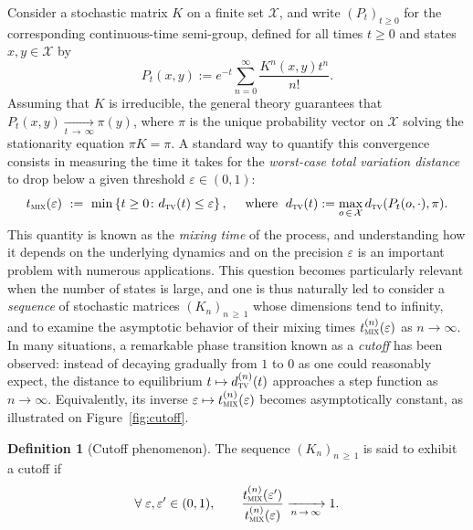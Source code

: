\documentclass[10pt]{amsart}
\theoremstyle{definition}\newtheorem{defi}[theo]{Definition}\newtheorem{rema}[theo]{Remark}\newtheorem{exam}[theo]{Example}\newtheorem{exem}[theo]{Example}\newtheorem{nota}[theo]{Notation}
\newcommand{\cX}{\mathcal{X}}
\newcommand{\dtv}{d_{\textsc{tv}}}
\newcommand{\tmix}{t_{\textsc{mix}}}
\let\oldforall\forall
\renewcommand*{\forall}{\mathrel{\oldforall}}
\begin{document}
Consider a stochastic matrix $K$ on a finite set $\cX$, and write $(P_t)_{t\ge 0}$ for the corresponding continuous-time semi-group, defined for all times $t\ge 0$ and states $x,y\in\cX$ by
\[
P_t(x,y) := e^{-t}\sum_{n=0}^\infty \frac{K^n(x,y)t^n}{n!}.
\]
Assuming that $K$ is irreducible, the general theory guarantees that $P_t(x,y)\xrightarrow[t\,\to\,\infty]{}\pi(y)$, where $\pi$ is the unique probability vector on $\cX$ solving the stationarity equation $\pi K=\pi$. A standard way to quantify this convergence consists in measuring the time it takes for the \emph{worst-case total variation distance} to drop below a given threshold $\varepsilon\in(0,1)$:
\[
\tmix(\varepsilon) \ := \ \min\left\{t\ge 0\colon \dtv(t)\le\varepsilon\right\},\quad \text{ where }\; \dtv(t) := \max_{o\,\in\,\cX}\dtv(P_t(o,\cdot),\pi).
\]
This quantity is known as the \emph{mixing time} of the process, and understanding how it depends on the underlying dynamics and on the precision $\varepsilon$ is an important problem with numerous applications. This question becomes particularly relevant when the number of states is large, and one is thus naturally led to consider a \emph{sequence} of stochastic matrices $(K_n)_{n\,\ge\,1}$ whose dimensions tend to infinity, and to examine the asymptotic behavior of their mixing times $\tmix^{(n)}(\varepsilon)$ as $n\to\infty$. In many situations, a remarkable phase transition known as a \emph{cutoff} has been observed: instead of decaying gradually from $1$ to $0$ as one could reasonably expect, the distance to equilibrium $t\mapsto\dtv^{(n)}(t)$ approaches a step function as $n\to\infty$. Equivalently, its inverse $\varepsilon\mapsto \tmix^{(n)}(\varepsilon)$ becomes asymptotically constant, as illustrated on Figure~\ref{fig:cutoff}.


\begin{defi}[{Cutoff phenomenon}]
The sequence $(K_n)_{n\,\ge\,1}$ is said to exhibit a cutoff if
\[
\forall \varepsilon,\varepsilon'\in(0,1),\qquad \frac{\tmix^{(n)}(\varepsilon')}{\tmix^{(n)}(\varepsilon)} \xrightarrow[n\,\to\,\infty]{} 1.
\]
\end{defi}
\end{document}
